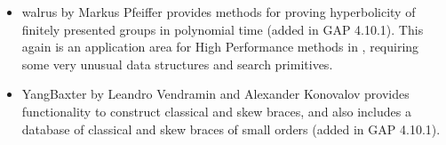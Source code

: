 \begin{itemize}
\item
{\sf walrus} by Markus Pfeiffer \cite{walrus} provides methods for proving 
hyperbolicity of finitely presented groups in polynomial time
(added in GAP 4.10.1). This again is an application area for High
Performance methods in \GAP, requiring some very unusual data
structures and search primitives.

\item
{\sf YangBaxter} by Leandro Vendramin and Alexander Konovalov \cite{YangBaxter}
provides functionality to construct classical and 
skew braces, and also includes a database of classical 
and skew braces of small orders (added in GAP 4.10.1).

\end{itemize}
